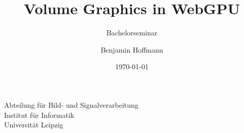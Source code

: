 \title[Volume Graphics in WebGPU]{Volume Graphics in WebGPU }
\subtitle[Group seminar]{Bachelorseminar} 
\author{Benjamin Hoffmann}
\institute
{Abteilung für Bild- und Signalverarbeitung\\
Institut für Informatik\\
Universit\"at Leipzig}
\date{\today}



